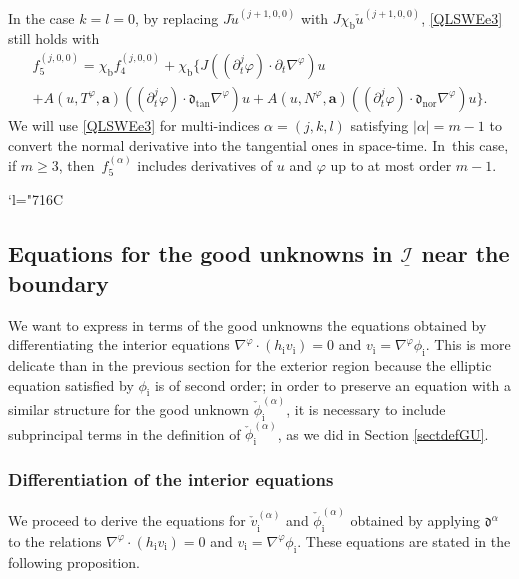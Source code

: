 \documentclass[11pt]{article}
\newcommand{\Changelback}{\mathcode`l="716C}
\newcommand{\dtan}{{\mathfrak d}_\mathrm{tan}}
\newcommand{\dnor}{{\mathfrak d}_\mathrm{nor}}
\newcommand{\dt}{\partial_t}
\newcommand{\cI}{{\mathcal I}}
\newcommand{\ul}[1]{\underline{#1}}
\theoremstyle{definition}
\begin{document}
In the case $k=l=0$, by replacing $J\check{u}^{(j+1,0,0)}$ with $J\chi_\mathrm{b}\check{u}^{(j+1,0,0)}$, \eqref{QLSWEe3} still holds with
\begin{multline*}
f_5^{(j,0,0)}
= \chi_\mathrm{b}f_4^{(j,0,0)} + \chi_\mathrm{b} \{ J((\dt^j\varphi)\cdot\dt\nabla^\varphi)u \\
+ A(u,T^\varphi,\bm{a})((\dt^j\varphi)\cdot\dtan\nabla^\varphi)u
+ A(u,N^\varphi,\bm{a})((\dt^j\varphi)\cdot\dnor\nabla^\varphi)u \}.
\end{multline*}
We will use \eqref{QLSWEe3} for multi-indices $\alpha=(j,k,l)$ satisfying $|\alpha|=m-1$ to convert the normal derivative into the tangential ones in space-time. In~this case, if $m\geq3$, then~$f_5^{(\alpha)}$ includes derivatives of $u$ and $\varphi$ up to at most order $m-1$.

\Changelback

\subsection{Equations for the good unknowns in $\ul{\cI}$ near the boundary}\label{sectnearbdry}
We want to express in terms of the good unknowns the equations obtained by differentiating the interior equations $\nabla^\varphi\cdot(h_\mathrm{i}v_\mathrm{i})=0$
and $v_\mathrm{i}=\nabla^\varphi\phi_\mathrm{i}$.
This is more delicate than in the previous section for the exterior region because the elliptic equation satisfied by $\phi_\mathrm{i}$ is of second order;
in order to preserve an equation with a similar structure for the good unknown $\check\phi_\mathrm{i}^{(\alpha)}$,
it is necessary to include subprincipal terms in the definition of $\check\phi_\mathrm{i}^{(\alpha)}$, as we did in Section \ref{sectdefGU}.

\subsubsection{Differentiation of the interior equations}
We proceed to derive the equations for $\check{v}_\mathrm{i}^{(\alpha)}$ and $\check{\phi}_\mathrm{i}^{(\alpha)}$
obtained by applying $\mathfrak{d}^\alpha$ to the relations $\nabla^\varphi\cdot (h_\mathrm{i}v_\mathrm{i})=0$ and $v_\mathrm{i}=\nabla^\varphi \phi_\mathrm{i}$.
These equations are stated in the following proposition.
\end{document}
